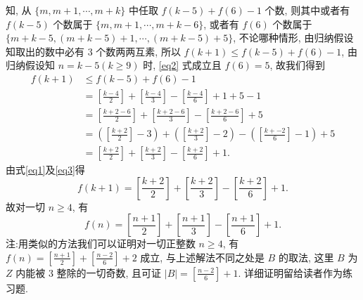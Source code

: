 知, 从 $\{m, m+1, \cdots, m+k\}$ 中任取 $f(k-5)+f(6)-1$ 个数, 则其中或者有 $f(k-5)$ 个数属于 $\{m, m+1, \cdots, m+k-6\}$, 或者有 $f(6)$ 个数属于 $\{m+ k-5,(m+k-5)+1, \cdots,(m+k-5)+5\}$, 不论哪种情形, 由归纳假设知取出的数中必有 3 个数两两互素, 所以 $f(k+1) \leqslant f(k-5)+f(6)-1$, 由归纳假设知 $n=k-5(k \geqslant 9)$ 时, \ref{eq2} 式成立且 $f(6)=5$, 故我们得到
$$
\begin{aligned}
f(k+1) & \leqslant f(k-5)+f(6)-1 \\
& =\left[\frac{k-4}{2}\right]+\left[\frac{k-4}{3}\right]-\left[\frac{k-4}{6}\right]+1+5-1 \\
& =\left[\frac{k+2-6}{2}\right]+\left[\frac{k+2-6}{3}\right]-\left[\frac{k+2-6}{6}\right]+5 \\
& =\left(\left[\frac{k+2}{2}\right]-3\right)+\left(\left[\frac{k+2}{3}\right]-2\right)-\left(\left[\frac{k+-2}{6}\right]-1\right)+5 \\
& =\left[\frac{k+2}{2}\right]+\left[\frac{k+2}{3}\right]-\left[\frac{k+2}{6}\right]+1 . \label{eq3}
\end{aligned}
$$
由式\ref{eq1}及\ref{eq3}得
$$
f(k+1)=\left[\frac{k+2}{2}\right]+\left[\frac{k+2}{3}\right]-\left[\frac{k+2}{6}\right]+1 .
$$
故对一切 $n \geqslant 4$, 有
$$
f(n)=\left[\frac{n+1}{2}\right]+\left[\frac{n+1}{3}\right]-\left[\frac{n+1}{6}\right]+1 .
$$
注:用类似的方法我们可以证明对一切正整数 $n \geqslant 4$, 有 $f(n)= \left[\frac{n+1}{2}\right]+\left[\frac{n-2}{6}\right]+2$ 成立, 与上述解法不同之处是 $B$ 的取法, 这里 $B$ 为 $Z$ 内能被 3 整除的一切奇数, 且可证 $|B|=\left[\frac{n-2}{6}\right]+1$. 详细证明留给读者作为练习题.


